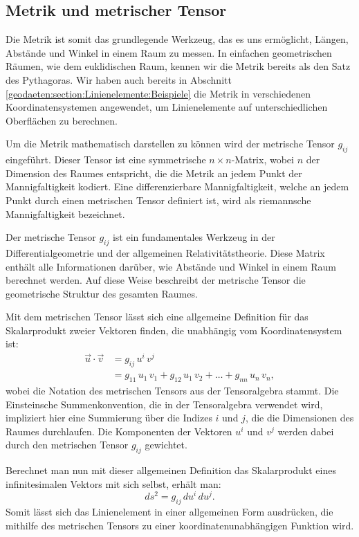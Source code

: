 \subsection{Metrik und metrischer Tensor}

Die Metrik ist somit das grundlegende Werkzeug, das es uns ermöglicht, Längen, Abstände und Winkel in einem Raum zu messen.
In einfachen geometrischen Räumen, wie dem euklidischen Raum, kennen wir die Metrik bereits als den Satz des Pythagoras.
Wir haben auch bereits in Abschnitt \ref{geodaeten:section:Linienelemente:Beispiele} die Metrik in verschiedenen Koordinatensystemen angewendet, um Linienelemente auf unterschiedlichen Oberflächen zu berechnen.

Um die Metrik mathematisch darstellen zu können wird der metrische Tensor $g_{ij}$ eingeführt.
Dieser Tensor ist eine symmetrische $n \times n$-Matrix, wobei $n$ der Dimension des Raumes entspricht, die die Metrik an jedem Punkt der Mannigfaltigkeit kodiert.
Eine differenzierbare Mannigfaltigkeit, welche an jedem Punkt durch einen metrischen Tensor definiert ist, wird als riemannsche Mannigfaltigkeit bezeichnet.

Der metrische Tensor $g_{ij}$ ist ein fundamentales Werkzeug in der Differentialgeometrie und der allgemeinen Relativitätstheorie. 
Diese Matrix enthält alle Informationen darüber, wie Abstände und Winkel in einem Raum berechnet werden.
Auf diese Weise beschreibt der metrische Tensor die geometrische Struktur des gesamten Raumes.

Mit dem metrischen Tensor lässt sich eine allgemeine Definition für das Skalarprodukt zweier Vektoren finden, die unabhängig vom Koordinatensystem ist:
	\begin{align}
		\vec{u} \cdot \vec{v} &= g_{ij} \, u^i \, v^j \\
		&= g_{11} \, u_1 \, v_1 + g_{12} \, u_1 \, v_2 + \dots + g_{nn} \, u_n \, v_n,
	\end{align}
wobei die Notation des metrischen Tensors aus der Tensoralgebra stammt.
Die Einsteinsche Summenkonvention, die in der Tensoralgebra verwendet wird, impliziert hier eine Summierung über die Indizes $i$ und $j$, die die Dimensionen des Raumes durchlaufen.
Die Komponenten der Vektoren $u^i$ und $v^j$ werden dabei durch den metrischen Tensor $g_{ij}$ gewichtet.

Berechnet man nun mit dieser allgemeinen Definition das Skalarprodukt eines infinitesimalen Vektors mit sich selbst, erhält man:
\begin{equation}
	ds^2 = g_{ij} \, du^i \, du^j.
	\label{geodaeten:equation:MetrischerTensor:AllgemeinesLinienelement}
\end{equation}
Somit lässt sich das Linienelement in einer allgemeinen Form ausdrücken, die mithilfe des metrischen Tensors zu einer koordinatenunabhängigen Funktion wird.

